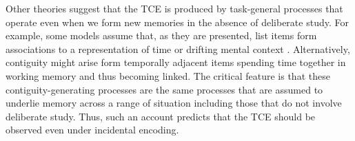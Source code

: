 \documentclass[jou,natbib,floatsintext]{apa6} %
\begin{document}
Other theories suggest that the TCE is produced by task-general processes that operate even when we form new memories in the absence of deliberate study. For example, some models assume that, as they are presented, list items form associations to a representation of time \citep{HowaEtal14a,BrowEtal07} or drifting mental context \citep{LohnEtal14}. Alternatively, contiguity might arise form temporally adjacent items spending time together in working memory and thus becoming linked. The critical feature is that these contiguity-generating processes are the same processes that are assumed to underlie memory across a range of situation including those that do not involve deliberate study. Thus, such an account  predicts that the TCE should be observed even under incidental encoding.















\end{document}
